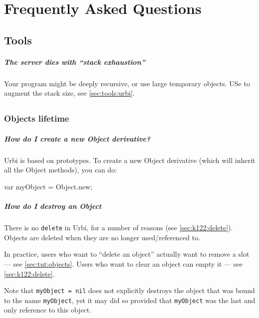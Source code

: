 \chapter{Frequently Asked Questions}
\label{sec:faq}

\section{Tools}
\paragraph{The server dies with ``stack exhaustion''}
Your program might be deeply recursive, or use large temporary
objects.  USe  to augment the stack size, see
\autoref{sec:tools:urbi}.

\section{\us}
\subsection{Objects lifetime}

\paragraph{How do I create a new Object derivative?}
Urbi is based on prototypes. To create a new Object derivative (which
will inherit all the Object methods), you can do:

\begin{urbifixme}
var myObject = Object.new;
\end{urbifixme}

\paragraph{How do I destroy an Object}
There is no \lstinline{delete} in Urbi, for a number of reasons (see
\autoref{sec:k122:delete}).  Objects are deleted when they are no
longer used/referenced to.

In practice, users who want to ``delete an object'' actually want to
remove a slot --- see \autoref{sec:tut:objects}.  Users who want to
clear an object can empty it --- see \autoref{sec:k122:delete}.

Note that \lstinline{myObject = nil} does not explicitly destroys the
object that was bound to the name \lstinline{myObject}, yet it may did
so provided that \lstinline{myObject} was the last and only reference
to this object.

